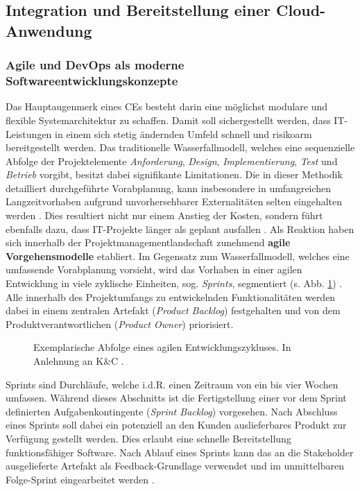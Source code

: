 \subsection{Integration und Bereitstellung einer Cloud-Anwendung}
\subsubsection{Agile und DevOps als moderne Softwareentwicklungskonzepte}
Das Hauptaugenmerk eines CEs besteht darin eine möglichst modulare und flexible Systemarchitektur zu schaffen. Damit soll sichergestellt werden, dass IT-Leistungen in einem sich stetig ändernden Umfeld schnell und risikoarm bereitgestellt werden. Das traditionelle Wasserfallmodell, welches eine sequenzielle Abfolge der Projektelemente \textit{Anforderung}, \textit{Design}, \textit{Implementierung}, \textit{Test} und \textit{Betrieb} vorgibt, besitzt dabei signifikante Limitationen. Die in dieser Methodik detailliert durchgeführte Vorabplanung, kann insbesondere in umfangreichen Langzeitvorhaben aufgrund unvorhersehbarer Externalitäten selten eingehalten werden \cite[5]{Vivenzio.2013}. Dies resultiert nicht nur einem Anstieg der Kosten, sondern führt ebenfalls dazu, dass IT-Projekte länger als geplant ausfallen \cite[41]{Vieweg.2015}. Als Reaktion haben sich innerhalb der Projektmanagementlandschaft zunehmend \textbf{agile Vorgehensmodelle} etabliert.
Im Gegensatz zum Wasserfallmodell, welches eine umfassende Vorabplanung vorsieht, wird das Vorhaben in einer agilen Entwicklung in viele zyklische Einheiten, sog. \textit{Sprints}, segmentiert (s. Abb. \ref*{fig:Agile_Cycle}) \cite[87]{Goll.2015}. Alle innerhalb des Projektumfangs zu entwickelnden Funktionalitäten werden dabei in einem zentralen Artefakt (\textit{Product Backlog}) festgehalten und von dem Produktverantwortlichen (\textit{Product Owner}) priorisiert. 
\begin{center}
	\begin{figure}[H]
		\centering
		\caption[Exemplarische Abfolge eines agilen Entwicklungszykluses]{Exemplarische Abfolge eines agilen Entwicklungszykluses. In Anlehnung an K\&C \cite{K&C.2021}.}
		\label{fig:Agile_Cycle}
	\end{figure}	
\end{center}
\vspace*{-15mm}
Sprints sind Durchläufe, welche i.d.R. einen Zeitraum von ein bis vier Wochen umfassen. Während dieses Abschnitts ist die Fertigstellung einer vor dem Sprint definierten Aufgabenkontingente (\textit{Sprint Backlog}) vorgesehen. Nach Abschluss eines Sprints soll dabei ein potenziell an den Kunden auslieferbares Produkt zur Verfügung gestellt werden. Dies erlaubt eine schnelle Bereitstellung funktionsfähiger Software. Nach Ablauf eines Sprints kann das an die Stakeholder ausgelieferte Artefakt als Feedback-Grundlage verwendet und im unmittelbaren Folge-Sprint eingearbeitet werden \cite[39]{K&C.2021}.
